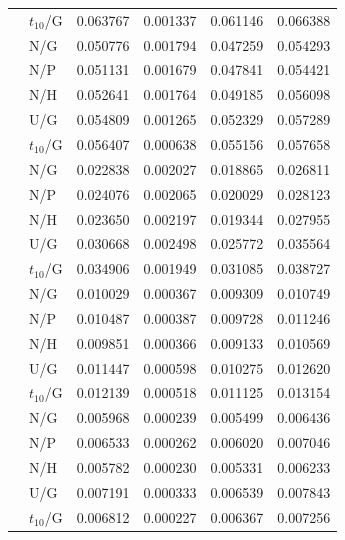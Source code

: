 \documentclass[11pt,a4paper]{article}
\theoremstyle{remark}
\begin{document}
\begin{table}[H]
\begin{tabular}{@{}rlrrrr@{}}
 & $t_{10}$/G & 0.063767 & 0.001337 & 0.061146 & 0.066388\\
\addlinespace[3pt]
512 & N/G & 0.050776 & 0.001794 & 0.047259 & 0.054293\\
 & N/P & 0.051131 & 0.001679 & 0.047841 & 0.054421\\
 & N/H & 0.052641 & 0.001764 & 0.049185 & 0.056098\\
 & U/G & 0.054809 & 0.001265 & 0.052329 & 0.057289\\
 & $t_{10}$/G & 0.056407 & 0.000638 & 0.055156 & 0.057658\\
\addlinespace[3pt]
1024 & N/G & 0.022838 & 0.002027 & 0.018865 & 0.026811\\
 & N/P & 0.024076 & 0.002065 & 0.020029 & 0.028123\\
 & N/H & 0.023650 & 0.002197 & 0.019344 & 0.027955\\
 & U/G & 0.030668 & 0.002498 & 0.025772 & 0.035564\\
 & $t_{10}$/G & 0.034906 & 0.001949 & 0.031085 & 0.038727\\
\addlinespace[3pt]
2048 & N/G & 0.010029 & 0.000367 & 0.009309 & 0.010749\\
 & N/P & 0.010487 & 0.000387 & 0.009728 & 0.011246\\
 & N/H & 0.009851 & 0.000366 & 0.009133 & 0.010569\\
 & U/G & 0.011447 & 0.000598 & 0.010275 & 0.012620\\
 & $t_{10}$/G & 0.012139 & 0.000518 & 0.011125 & 0.013154\\
\addlinespace[3pt]
4096 & N/G & 0.005968 & 0.000239 & 0.005499 & 0.006436\\
 & N/P & 0.006533 & 0.000262 & 0.006020 & 0.007046\\
 & N/H & 0.005782 & 0.000230 & 0.005331 & 0.006233\\
 & U/G & 0.007191 & 0.000333 & 0.006539 & 0.007843\\
 & $t_{10}$/G & 0.006812 & 0.000227 & 0.006367 & 0.007256\\
\bottomrule
\end{tabular}
\end{table}
\end{document}
